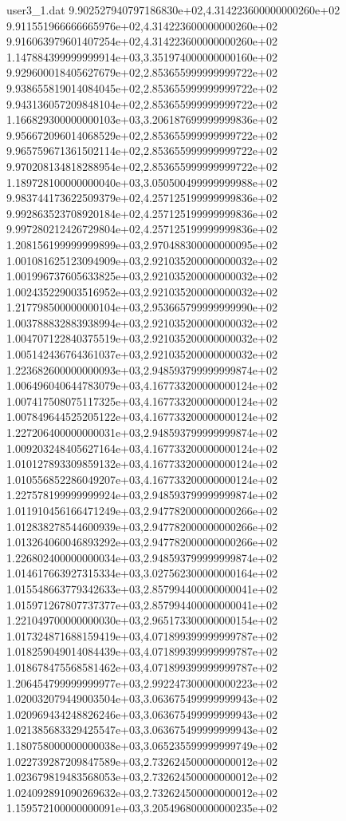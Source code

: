 \begin{filecontents}{user3_1.dat}
9.902527940797186830e+02,4.314223600000000260e+02
9.911551966666665976e+02,4.314223600000000260e+02
9.916063979601407254e+02,4.314223600000000260e+02
1.147884399999999914e+03,3.351974000000000160e+02
9.929600018405627679e+02,2.853655999999999722e+02
9.938655819014084045e+02,2.853655999999999722e+02
9.943136057209848104e+02,2.853655999999999722e+02
1.166829300000000103e+03,3.206187699999999836e+02
9.956672096014068529e+02,2.853655999999999722e+02
9.965759671361502114e+02,2.853655999999999722e+02
9.970208134818288954e+02,2.853655999999999722e+02
1.189728100000000040e+03,3.050500499999999988e+02
9.983744173622509379e+02,4.257125199999999836e+02
9.992863523708920184e+02,4.257125199999999836e+02
9.997280212426729804e+02,4.257125199999999836e+02
1.208156199999999899e+03,2.970488300000000095e+02
1.001081625123094909e+03,2.921035200000000032e+02
1.001996737605633825e+03,2.921035200000000032e+02
1.002435229003516952e+03,2.921035200000000032e+02
1.217798500000000104e+03,2.953665799999999990e+02
1.003788832883938994e+03,2.921035200000000032e+02
1.004707122840375519e+03,2.921035200000000032e+02
1.005142436764361037e+03,2.921035200000000032e+02
1.223682600000000093e+03,2.948593799999999874e+02
1.006496040644783079e+03,4.167733200000000124e+02
1.007417508075117325e+03,4.167733200000000124e+02
1.007849644525205122e+03,4.167733200000000124e+02
1.227206400000000031e+03,2.948593799999999874e+02
1.009203248405627164e+03,4.167733200000000124e+02
1.010127893309859132e+03,4.167733200000000124e+02
1.010556852286049207e+03,4.167733200000000124e+02
1.227578199999999924e+03,2.948593799999999874e+02
1.011910456166471249e+03,2.947782000000000266e+02
1.012838278544600939e+03,2.947782000000000266e+02
1.013264060046893292e+03,2.947782000000000266e+02
1.226802400000000034e+03,2.948593799999999874e+02
1.014617663927315334e+03,3.027562300000000164e+02
1.015548663779342633e+03,2.857994400000000041e+02
1.015971267807737377e+03,2.857994400000000041e+02
1.221049700000000030e+03,2.965173300000000154e+02
1.017324871688159419e+03,4.071899399999999787e+02
1.018259049014084439e+03,4.071899399999999787e+02
1.018678475568581462e+03,4.071899399999999787e+02
1.206454799999999977e+03,2.992247300000000223e+02
1.020032079449003504e+03,3.063675499999999943e+02
1.020969434248826246e+03,3.063675499999999943e+02
1.021385683329425547e+03,3.063675499999999943e+02
1.180758000000000038e+03,3.065235599999999749e+02
1.022739287209847589e+03,2.732624500000000012e+02
1.023679819483568053e+03,2.732624500000000012e+02
1.024092891090269632e+03,2.732624500000000012e+02
1.159572100000000091e+03,3.205496800000000235e+02

\end{filecontents}
